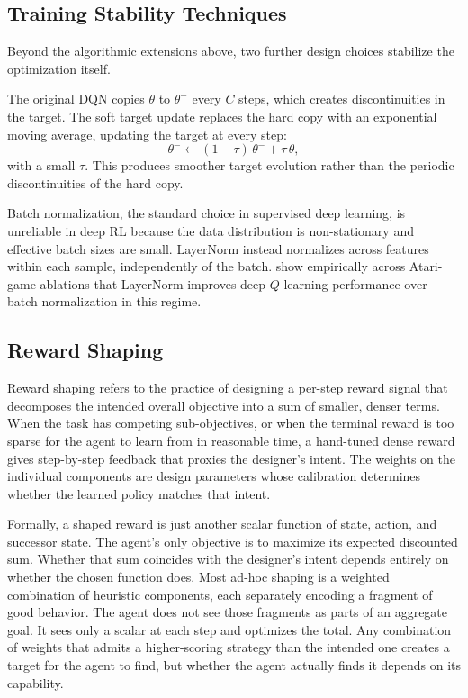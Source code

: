 \documentclass[12pt,a4paper,titlepage]{article}
\begin{document}
\subsection{Training Stability Techniques}
\label{sec:stability}

Beyond the algorithmic extensions above, two further design choices stabilize the optimization itself.

The original DQN copies $\theta$ to $\theta^-$ every $C$ steps, which creates discontinuities in the target. The soft target update \citep{Lillicrap2016} replaces the hard copy with an exponential moving average, updating the target at every step:
\begin{equation}
\theta^- \leftarrow (1 - \tau)\,\theta^- + \tau\,\theta,
\end{equation}
with a small $\tau$. This produces smoother target evolution rather than the periodic discontinuities of the hard copy.

Batch normalization, the standard choice in supervised deep learning, is unreliable in deep RL because the data distribution is non-stationary and effective batch sizes are small. LayerNorm \citep{Ba2016} instead normalizes across features within each sample, independently of the batch. \citet{Gallici2024} show empirically across Atari-game ablations that LayerNorm improves deep $Q$-learning performance over batch normalization in this regime.

\subsection{Reward Shaping}
\label{sec:reward_shaping_bg}

Reward shaping refers to the practice of designing a per-step reward signal that decomposes the intended overall objective into a sum of smaller, denser terms. When the task has competing sub-objectives, or when the terminal reward is too sparse for the agent to learn from in reasonable time, a hand-tuned dense reward gives step-by-step feedback that proxies the designer's intent. The weights on the individual components are design parameters whose calibration determines whether the learned policy matches that intent.

Formally, a shaped reward is just another scalar function of state, action, and successor state. The agent's only objective is to maximize its expected discounted sum. Whether that sum coincides with the designer's intent depends entirely on whether the chosen function does. Most ad-hoc shaping is a weighted combination of heuristic components, each separately encoding a fragment of good behavior. The agent does not see those fragments as parts of an aggregate goal. It sees only a scalar at each step and optimizes the total. Any combination of weights that admits a higher-scoring strategy than the intended one creates a target for the agent to find, but whether the agent actually finds it depends on its capability.
\end{document}

